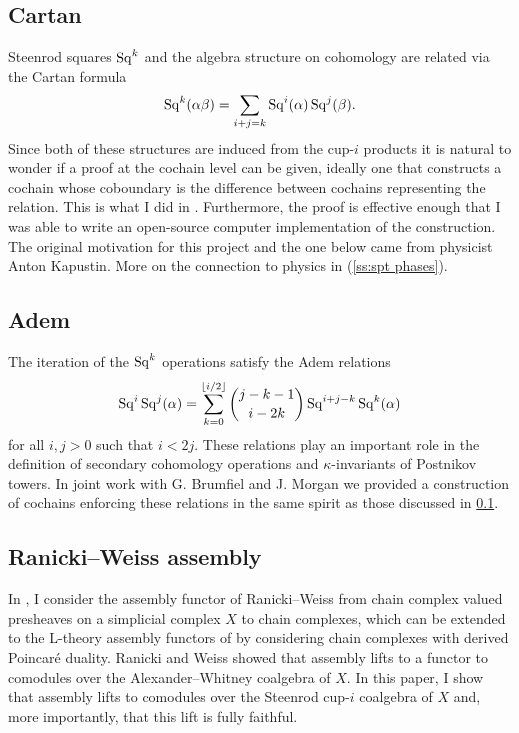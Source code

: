 \subsection{Cartan} \label{ss:cartan}

Steenrod squares $\operatorname{Sq}^k$ and the algebra structure on cohomology are related via the Cartan formula
\begin{equation*}
\operatorname{Sq}^k(\alpha \beta) = \sum_{i+j=k} \operatorname{Sq}^i(\alpha) \operatorname{Sq}^j(\beta).
\end{equation*}
Since both of these structures are induced from the cup-$i$ products it is natural to wonder if a proof at the cochain level can be given, ideally one that constructs a cochain whose coboundary is the difference between cochains representing the relation.
This is what I did in \cite{medina2020cartan}.
Furthermore, the proof is effective enough that I was able to write an open-source computer implementation of the construction.
The original motivation for this project and the one below came from physicist Anton Kapustin.
More on the connection to physics in (\cref{ss:spt phases}).

\subsection{Adem} \label{ss:adem}

The iteration of the $\operatorname{Sq}^k$ operations satisfy the Adem relations
\begin{equation*}
\operatorname{Sq}^i \operatorname{Sq}^j(\alpha) = \sum_{k=0}^{\lfloor i/2 \rfloor} \binom{j-k-1}{i-2k} \operatorname{Sq}^{i+j-k} \operatorname{Sq}^k(\alpha)
\end{equation*}
for all $i,j > 0$ such that $i < 2j$.
These relations play an important role in the definition of secondary cohomology operations and $\kappa$-invariants of Postnikov towers.
In joint work with G. Brumfiel and J. Morgan \cite{medina2021adem} we provided a construction of cochains enforcing these relations in the same spirit as those discussed in \cref{ss:cartan}.

\subsection{Ranicki--Weiss assembly}

In \cite{medina2022assembly}, I consider the assembly functor of Ranicki--Weiss \cite{ranicki1990assembly} from chain complex valued presheaves on a simplicial complex $X$ to chain complexes, which can be extended to the L-theory assembly functors of \cite{ranicki1992topological} by considering chain complexes with derived Poincar\'e duality.
Ranicki and Weiss showed that assembly lifts to a functor to comodules over the Alexander--Whitney coalgebra of $X$.
In this paper, I show that assembly lifts to comodules over the Steenrod cup-$i$ coalgebra of $X$ and, more importantly, that this lift is fully faithful.


